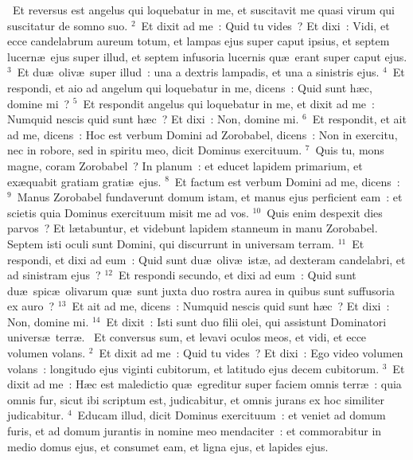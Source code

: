 ~\lettrine[lines=10,image=true,loversize=0.05,lraise=-0.03]{E}{}t reversus est angelus qui loquebatur in me, et suscitavit me quasi virum qui suscitatur de somno suo.
${}^{2}$~Et dixit ad me~: Quid tu vides~? Et dixi~: Vidi, et ecce candelabrum aureum totum, et lampas ejus super caput ipsius, et septem lucern\ae\ ejus super illud, et septem infusoria lucernis qu\ae\ erant super caput ejus.
${}^{3}$~Et du\ae\ oliv\ae\ super illud~: una a dextris lampadis, et una a sinistris ejus.
${}^{4}$~Et respondi, et aio ad angelum qui loquebatur in me, dicens~: Quid sunt h\ae c, domine mi~?
${}^{5}$~Et respondit angelus qui loquebatur in me, et dixit ad me~: Numquid nescis quid sunt h\ae c~? Et dixi~: Non, domine mi.
${}^{6}$~Et respondit, et ait ad me, dicens~: Hoc est verbum Domini ad Zorobabel, dicens~: Non in exercitu, nec in robore, sed in spiritu meo, dicit Dominus exercituum.
${}^{7}$~Quis tu, mons magne, coram Zorobabel~? In planum~: et educet lapidem primarium, et ex\ae quabit gratiam grati\ae\ ejus.
${}^{8}$~Et factum est verbum Domini ad me, dicens~:
${}^{9}$~Manus Zorobabel fundaverunt domum istam, et manus ejus perficient eam~: et scietis quia Dominus exercituum misit me ad vos.
${}^{10}$~Quis enim despexit dies parvos~? Et l\ae tabuntur, et videbunt lapidem stanneum in manu Zorobabel. Septem isti oculi sunt Domini, qui discurrunt in universam terram.
${}^{11}$~Et respondi, et dixi ad eum~: Quid sunt du\ae\ oliv\ae\ ist\ae , ad dexteram candelabri, et ad sinistram ejus~?
${}^{12}$~Et respondi secundo, et dixi ad eum~: Quid sunt du\ae\ spic\ae\ olivarum qu\ae\ sunt juxta duo rostra aurea in quibus sunt suffusoria ex auro~?
${}^{13}$~Et ait ad me, dicens~: Numquid nescis quid sunt h\ae c~? Et dixi~: Non, domine mi.
${}^{14}$~Et dixit~: Isti sunt duo filii olei, qui assistunt Dominatori univers\ae\ terr\ae .
~\lettrine[lines=10,image=true,loversize=0.05,lraise=-0.03]{E}{}t conversus sum, et levavi oculos meos, et vidi, et ecce volumen volans.
${}^{2}$~Et dixit ad me~: Quid tu vides~? Et dixi~: Ego video volumen volans~: longitudo ejus viginti cubitorum, et latitudo ejus decem cubitorum.
${}^{3}$~Et dixit ad me~: H\ae c est maledictio qu\ae\ egreditur super faciem omnis terr\ae~: quia omnis fur, sicut ibi scriptum est, judicabitur, et omnis jurans ex hoc similiter judicabitur.
${}^{4}$~Educam illud, dicit Dominus exercituum~: et veniet ad domum furis, et ad domum jurantis in nomine meo mendaciter~: et commorabitur in medio domus ejus, et consumet eam, et ligna ejus, et lapides ejus.


